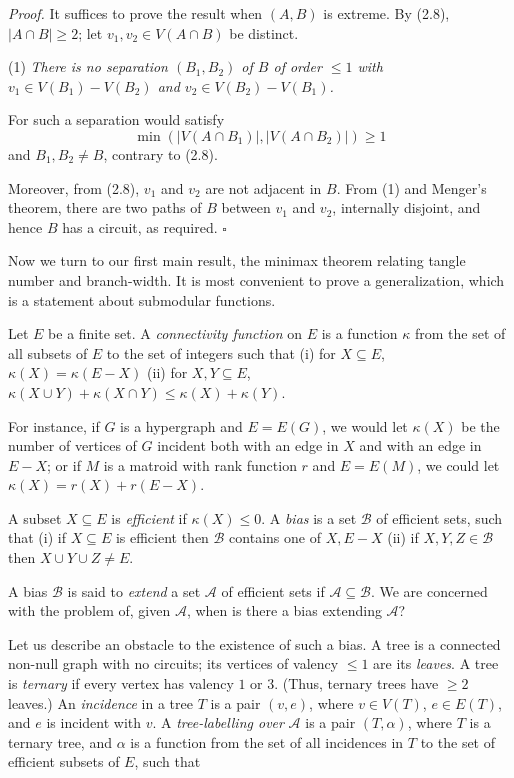 \textit{Proof.} It suffices to prove the result when $(A, B)$ is extreme. By (2.8), $|A\cap B|\ge 2$; let $v_1, v_2\in V(A\cap B)$ be distinct.

\hspace*{12pt}(1) \textit{There is no separation $(B_1, B_2)$ of $B$ of order $\le 1$ with $v_1\in V(B_1) - V(B_2)$ and $v_2\in V(B_2) - V(B_1)$.}

For such a separation would satisfy
\begin{equation*}
\min(|V(A\cap B_1)|, |V(A\cap B_2)|)\ge 1
\end{equation*}
and $B_1, B_2\ne B$, contrary to (2.8).

Moreover, from (2.8), $v_1$ and $v_2$ are not adjacent in $B$. From (1) and Menger's theorem, there are two paths of $B$ between $v_1$ and $v_2$, internally disjoint, and hence $B$ has a circuit, as required. $\square$


Now we turn to our first main result, the minimax theorem relating tangle number and branch-width. It is most convenient to prove a generalization, which is a statement about submodular functions.

Let $E$ be a finite set. A \textit{connectivity function} on $E$ is a function $\kappa$ from the set of all subsets of $E$ to the set of integers such that (i) for $X\subseteq E$, $\kappa(X) = \kappa(E - X)$ (ii) for $X, Y\subseteq E$, $\kappa(X\cup Y) + \kappa(X\cap Y)\le \kappa(X) + \kappa(Y)$.

For instance, if $G$ is a hypergraph and $E = E(G)$, we would let $\kappa(X)$ be the number of vertices of $G$ incident both with an edge in $X$ and with an edge in $E - X$; or if $M$ is a matroid with rank function $r$ and $E = E(M)$, we could let $\kappa(X) = r(X) + r(E - X)$.

A subset $X\subseteq E$ is \textit{efficient} if $\kappa(X)\le 0$. A \textit{bias} is a set $\mathscr{B}$ of efficient sets, such that (i) if $X\subseteq E$ is efficient then $\mathscr{B}$ contains one of $X, E - X$ (ii) if $X, Y, Z\in \mathscr{B}$ then $X\cup Y\cup Z\ne E$.

A bias $\mathscr{B}$ is said to \textit{extend} a set $\mathscr{A}$ of efficient sets if $\mathscr{A}\subseteq \mathscr{B}$. We are concerned with the problem of, given $\mathscr{A}$, when is there a bias extending $\mathscr{A}$?

Let us describe an obstacle to the existence of such a bias. A tree is a connected non-null graph with no circuits; its vertices of valency $\le 1$ are its \textit{leaves}. A tree is \textit{ternary} if every vertex has valency $1$ or $3$. (Thus, ternary trees have $\ge 2$ leaves.) An \textit{incidence} in a tree $T$ is a pair $(v, e)$, where $v\in V(T)$, $e\in E(T)$, and $e$ is incident with $v$. A \textit{tree-labelling over} $\mathscr{A}$ is a pair $(T, \alpha)$, where $T$ is a ternary tree, and $\alpha$ is a function from the set of all incidences in $T$ to the set of efficient subsets of $E$, such that
